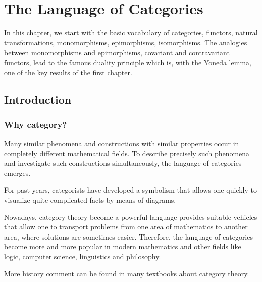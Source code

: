 \chapter{The Language of Categories}
  In this chapter, we start with the basic vocabulary of categories, functors, natural transformations, monomorphisms, epimorphisms, isomorphisms. The analogies between monomorphisms and epimorphisms, covariant and contravariant functors, lead to the famous duality principle which is, with the Yoneda lemma, one of the key results of the first chapter.
\minitoc
\newpage
\section{Introduction}
\subsection{Why category?}
  Many similar phenomena and constructions with similar properties occur in completely different mathematical fields.
  To describe precisely such phenomena and investigate such constructions simultaneously, the language of categories emerges.

  For past years, categorists have developed a symbolism that allows one quickly to visualize quite complicated facts by means of diagrams.

  Nowadays, category theory become a powerful language provides suitable vehicles that allow one to transport problems from one area of mathematics to another area, where solutions are sometimes easier. Therefore, the language of categories become more and more popular in modern mathematics and other fields like logic, computer science, linguistics and philosophy.

  More history comment can be found in many textbooks about category theory.

